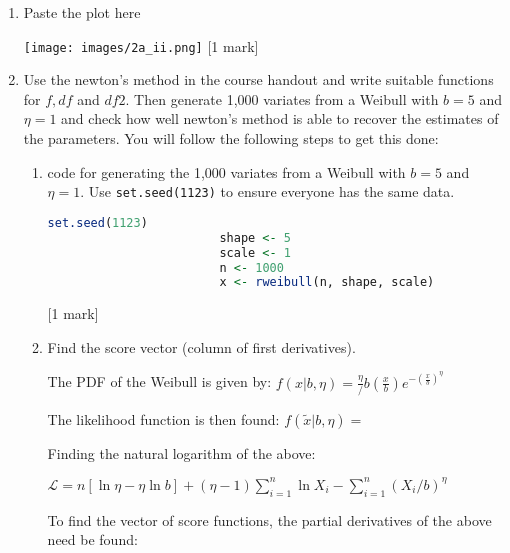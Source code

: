 \documentclass{article}
\begin{document}
\begin{enumerate}
\begin{enumerate}
\begin{enumerate}
\begin{lstlisting}[language=R]
					data = data.frame(x, f_x)
					
					fig <- plot_ly(
					data, 
					x=x, 
					y=f_x, 
					name='2-param Weibull', 
					type='scatter', 
					mode='lines')
					
					fig <- fig %>% layout(
					title = '2-Parameter Weibull Distribution', 
					plot_bgcolor = "#e5ecf6")
					fig <- fig %>% layout(
					autosize = F, 
					width = 500, 
					height = 500, 
					margin = 0)
					
					fig
				\end{lstlisting}
				\hfill[1 mark]  
				\item Paste the plot here 
				
				
				\texttt{[image: images/2a\_ii.png]}
				\hfill[1 mark]
				\item Use the newton’s method in the course handout and write suitable functions for $f, df$ and $df2$. Then generate 1,000 variates from a Weibull with $b = 5$ and $\eta = 1$ and check how well newton’s method is able to recover the estimates of the parameters.   You will follow the following steps to get this done:
				\begin{enumerate}
					\item code for generating the 1,000 variates from a Weibull with $b = 5$ and $\eta = 1$.   Use \texttt{set.seed(1123)} to ensure everyone has the same data.      
					\begin{lstlisting}[language=R]
						set.seed(1123)
						shape <- 5
						scale <- 1
						n <- 1000
						x <- rweibull(n, shape, scale)
					\end{lstlisting}
					\hfill [1 mark]
					
					\item Find the score vector (column of first derivatives).
					\newline
					
					The PDF of the Weibull is given by:
					$f(x|b, \eta) = \frac{\eta}/b \left(\frac{x}{b}\right) e^{-\left(\frac{x}{b}\right)^{\eta}} $
					
					The likelihood function is then found:
					$f(\widetilde{x}|b, \eta) = $
					
					Finding the natural logarithm of the above:
					
					$\mathcal{L} = n[\ln{\eta} - \eta\ln{b}] + (\eta - 1)\sum_{i=1}^{n}\ln{X_{i}} - \sum_{i=1}^{n}(X_{i}/b)^{\eta}$
					\newline
					
					To find the vector of score functions, the partial derivatives of the above need be found:
					

\end{enumerate}
\end{enumerate}
\end{enumerate}
\end{enumerate}
\end{document}
